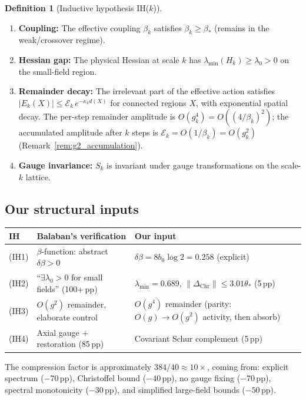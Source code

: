 \documentclass[11pt]{article}
\theoremstyle{definition}
\newtheorem{definition}[theorem]{Definition}
\begin{document}
\begin{definition}[Inductive hypothesis IH($k$)]\label{def:IH}
\begin{enumerate}[nosep,label=(IH\arabic*)]
\item \textbf{Coupling:}
The effective coupling $\beta_k$ satisfies $\beta_k\ge\beta_*$ (remains
in the weak/crossover regime).
\item \textbf{Hessian gap:}
The physical Hessian at scale $k$ has
$\lambda_{\min}(H_k)\ge\lambda_0>0$ on the small-field region.
\item \textbf{Remainder decay:}
The irrelevant part of the effective action satisfies
$|E_k(X)|\le\mathcal{E}_k\,e^{-\kappa_k d(X)}$ for connected
regions $X$, with exponential spatial decay.  The per-step
remainder amplitude is $O(g_k^4)=O((4/\beta_k)^2)$; the
accumulated amplitude after $k$ steps is
$\mathcal{E}_k=O(1/\beta_k)=O(g_k^2)$
(Remark~\ref{rem:g2_accumulation}).
\item \textbf{Gauge invariance:}
$S_k$ is invariant under gauge transformations on the scale-$k$ lattice.
\end{enumerate}
\end{definition}

\subsection{Our structural inputs}

\begin{center}
\begin{tabular}{lp{5cm}p{5cm}}
\toprule
\textbf{IH} & \textbf{Balaban's verification} & \textbf{Our input}\\
\midrule
(IH1) & $\beta$-function: abstract $\delta\beta>0$ &
$\delta\beta=8b_0\log 2=0.258$ (explicit)\\
(IH2) & ``$\exists\lambda_0>0$ for small fields'' (100+\,pp) &
$\lambda_{\min}=0.689$, $\|\Delta_{\mathrm{Chr}}\|\le 3.01\theta_*$ (5\,pp)\\
(IH3) & $O(g^2)$ remainder, elaborate control &
$O(g^4)$ remainder (parity: $O(g){\to}O(g^2)$ activity, then absorb)\\
(IH4) & Axial gauge $+$ restoration (85\,pp) &
Covariant Schur complement (5\,pp)\\
\bottomrule
\end{tabular}
\end{center}

The compression factor is approximately $384/40\approx 10\times$, coming
from: explicit spectrum ($-70$\,pp), Christoffel bound ($-40$\,pp),
no gauge fixing ($-70$\,pp), spectral monotonicity ($-30$\,pp), and
simplified large-field bounds ($-50$\,pp).
\end{document}
